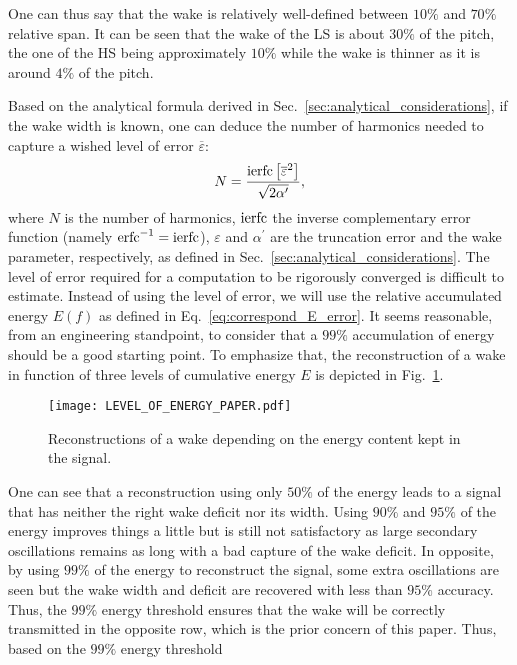 One can thus say that the wake is relatively well-defined
between $10\%$ and $70\%$ relative span. 
It can be seen that the wake of the 
LS \mockup is about $30\%$ of the pitch, the one of the HS
\mockup 
being approximately $10\%$ while the
\aipx wake is thinner as it is around $4\%$ of the pitch.

Based on the
analytical formula derived in Sec.~\ref{sec:analytical_considerations},
if the wake width is known, one can deduce the
number of harmonics needed to capture a wished level of error
$\overline{\varepsilon}$:
\begin{equation}
    N = \frac{\ierfc \left[\overline{\varepsilon}^2 \right]}{
    \sqrt{2 \alpha^\prime}},
    \label{eq:estimation_nb_harms}
\end{equation}
where $N$ is the number of harmonics, $\operatorname{ierfc}$ the inverse 
complementary error function (namely $\operatorname{erfc}^{-1} = \operatorname{ierfc}$),
$\varepsilon$ and $\alpha^\prime$ are the truncation error
and the wake parameter, respectively, as defined in 
Sec.~\ref{sec:analytical_considerations}.
The level of error required 
for a computation to be rigorously converged
is difficult to estimate. 
Instead of using the level of error, 
we will use the
relative accumulated energy $E(f)$ as defined in 
Eq.~\eqref{eq:correspond_E_error}.
It seems reasonable, from an engineering standpoint, to consider
that a $99\%$ accumulation of energy should be a good starting point.
To emphasize that,
the reconstruction of a wake in function of three levels of cumulative
energy $E$ is depicted in Fig.~\ref{fig:level_of_energy}. 
\begin{figure}[htbp]
  \centering
  \texttt{[image: LEVEL\_OF\_ENERGY\_PAPER.pdf]}
  \caption{Reconstructions of a wake depending on
  the energy content kept in the signal.}
  \label{fig:level_of_energy}
\end{figure}
One can see
that a reconstruction using only $50\%$ of the energy
leads to a signal that has neither
the right wake deficit nor its width. Using
$90\%$ and $95\%$ of the energy improves things a little
but is still not satisfactory as large secondary
oscillations remains as long with a bad capture
of the wake deficit.
In opposite, by using $99\%$ of the energy to reconstruct
the signal, some extra
oscillations are seen but 
the wake width and deficit are recovered with less than 
$95\%$ accuracy.
Thus, the $99\%$ energy threshold ensures that the wake
will be correctly transmitted in the opposite row, which is
the prior concern of this paper.
Thus, based on the $99\%$ energy threshold
